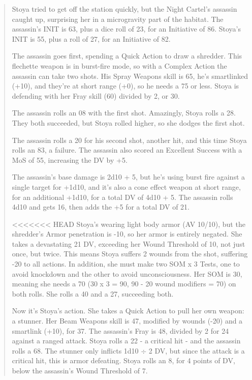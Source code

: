 \begin{quotation}
Stoya tried to get off the station quickly, but the Night Cartel’s assassin caught up, surprising her in a microgravity part of the habitat. The assassin’s INIT is 63, plus a dice roll of 23, for an Initiative of 86. Stoya’s INIT is 55, plus a roll of 27, for an Initiative of 82.

The assassin goes first, spending a Quick Action to draw a shredder. This flechette weapon is in burst-fire mode, so with a Complex Action the assassin can take two shots. His Spray Weapons skill is 65, he’s smartlinked (+10), and they’re at short range (+0), so he needs a 75 or less. Stoya is defending with her Fray skill (60) divided by 2, or 30.

The assassin rolls an 08 with the first shot. Amazingly, Stoya rolls a 28. They both succeeded, but Stoya rolled higher, so she dodges the first shot.

The assassin rolls a 20 for his second shot, another hit, and this time Stoya rolls an 83, a failure. The assassin also scored an Excellent Success with a MoS of 55, increasing the DV by +5.

The assassin’s base damage is 2d10 + 5, but he’s using burst fire against a single target for +1d10, and it’s also a cone effect weapon at short range, for an additional +1d10, for a total DV of 4d10 + 5. The assassin rolls 4d10 and gets 16, then adds the +5 for a total DV of 21.

<<<<<<< HEAD
Stoya’s wearing light body armor (AV 10/10), but the shredder’s Armor penetration is -10, so her armor is entirely negated. She takes a devastating 21 DV, exceeding her Wound Threshold of 10, not just once, but twice. This means Stoya suffers 2 wounds from the shot, suffering -20 to all actions. In addition, she must make two SOM x 3 Tests, one to avoid knockdown and the other to avoid unconsciousness. Her SOM is 30, meaning she needs a 70 (30 x 3 = 90, 90 - 20 wound modifiers = 70) on both rolls. She rolls a 40 and a 27, succeeding both.

Now it’s Stoya’s action. She takes a Quick Action to pull her own weapon: a stunner. Her Beam Weapons skill is 47, modified by wounds (-20) and a smartlink (+10), for 37. The assassin’s Fray is 48, divided by 2 for 24 against a ranged attack. Stoya rolls a 22 - a critical hit - and the assassin rolls a 68. The stunner only inflicts 1d10 $\div$ 2 DV, but since the attack is a critical hit, this is armor defeating. Stoya rolls an 8, for 4 points of DV, below the assassin’s Wound Threshold of 7.


\end{quotation}
